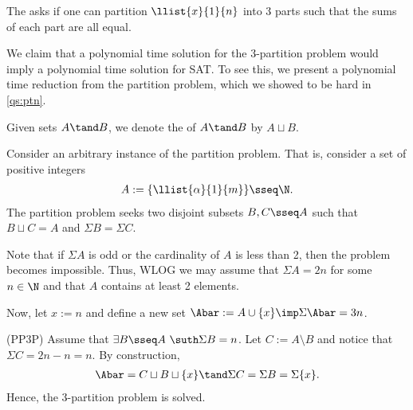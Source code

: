 \documentclass{article}
\begin{document}
\pagebreak


\begin{subexercise}\label{qs:3ptn}
  The  asks if one can partition $ \llist{x}{1}{n} $ into 3 parts such that the sums of each part are all equal.
\end{subexercise}

\begin{solution}
  We claim that a polynomial time solution for the 3-partition problem would imply a polynomial time solution for SAT.
  To see this, we present a polynomial time reduction from the partition problem, which we showed to be hard in \ref{qs:ptn}.

  \begin{notation}
  Given sets $ A \tand B$, we denote the  of $ A\tand B $ by $ A\sqcup B $.
  \end{notation}

  Consider an arbitrary instance of the partition problem.
  That is, consider a set of positive integers \begin{align*}
    A := \{\llist{\alpha}{1}{m}\} \sseq \N.
  \end{align*}
  The partition problem seeks two disjoint subsets $ B,C\sseq A $ such that $ B\sqcup C = A $ and $ \Sigma B = \Sigma C $.

  Note that if $ \Sigma A $ is odd or the cardinality of $ A $ is less than 2, then the problem becomes impossible.
  Thus, WLOG we may assume that $ \Sigma A = 2n $ for some $ n\in \N $ and that $ A $ contains at least 2 elements.

  Now, let $ x := n $ and define a new set $ \Abar := A\cup \{x\}\imp \Sigma \Abar = 3n $.

  \begin{subproof}[Correctness.]
    (PP\imp 3P)
    Assume that $ \exists B\sseq A\ \suth \Sigma B = n $.
    Let $ C := A \setminus B $ and notice that $ \Sigma C = 2n - n = n $.
    By construction,
    \begin{align*}
      \Abar = C\sqcup  B \sqcup \{x\} \tand \Sigma C = \Sigma B = \Sigma \{x\}.
    \end{align*}
    Hence, the 3-partition problem is solved.


\end{subproof}
\end{solution}
\end{document}
